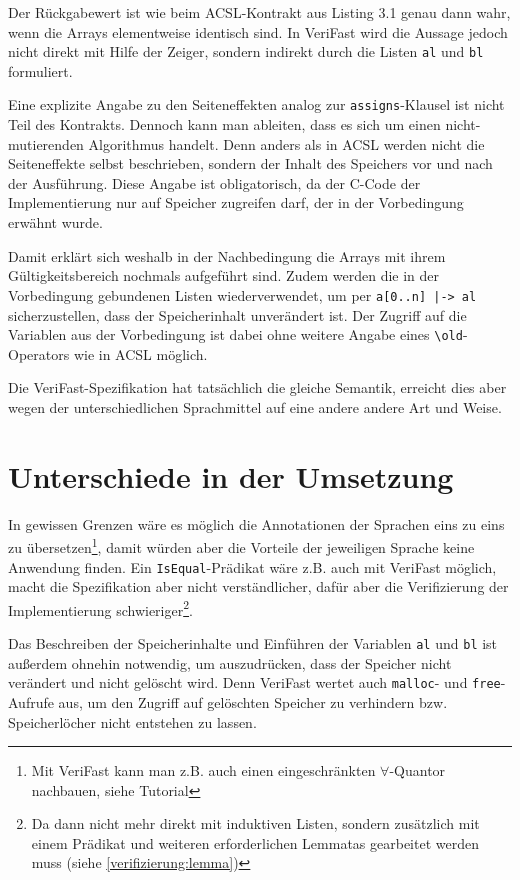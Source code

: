 Der Rückgabewert ist wie beim ACSL-Kontrakt aus Listing 3.1 genau dann wahr, wenn die Arrays elementweise
identisch sind. In VeriFast wird die Aussage jedoch nicht direkt mit Hilfe der Zeiger, sondern indirekt durch die
Listen \lstinline{al} und \lstinline{bl} formuliert.

Eine explizite Angabe zu den Seiteneffekten analog zur \lstinline{assigns}-Klausel ist nicht Teil des Kontrakts. 
Dennoch kann man ableiten, dass es sich um einen nicht-mutierenden Algorithmus handelt. Denn anders als in ACSL
werden nicht die Seiteneffekte selbst beschrieben, sondern der Inhalt des Speichers vor und nach der Ausführung.
Diese Angabe ist obligatorisch, da der C-Code der Implementierung nur auf Speicher zugreifen darf, der in der
Vorbedingung erwähnt wurde.

Damit erklärt sich weshalb in der Nachbedingung die Arrays mit ihrem Gültigkeitsbereich nochmals aufgeführt sind.
Zudem werden die in der Vorbedingung gebundenen Listen wiederverwendet, um per \lstinline{a[0..n] |-> al}
sicherzustellen, dass der Speicherinhalt unverändert ist. Der Zugriff auf die Variablen aus der Vorbedingung ist
dabei ohne weitere Angabe eines \lstinline{\old}-Operators wie in ACSL möglich.

Die VeriFast-Spezifikation hat tatsächlich die gleiche Semantik, erreicht dies aber wegen der 
unterschiedlichen Sprachmittel auf eine andere andere Art und Weise.


\section{Unterschiede in der Umsetzung}

In gewissen Grenzen wäre es möglich die Annotationen der Sprachen eins zu eins zu übersetzen\footnote{Mit
VeriFast kann man z.B. auch einen eingeschränkten \(\forall\)-Quantor nachbauen, siehe Tutorial\cite[Kap. 17]{jacobs-tutorial}},
damit würden aber die Vorteile der jeweiligen Sprache keine Anwendung finden. Ein \lstinline{IsEqual}-Prädikat wäre z.B.
auch mit VeriFast möglich, macht die Spezifikation aber nicht verständlicher, dafür aber die Verifizierung
der Implementierung schwieriger\footnote{Da dann nicht mehr direkt mit induktiven Listen, sondern zusätzlich
mit einem Prädikat und weiteren erforderlichen Lemmatas gearbeitet werden muss (siehe \ref{verifizierung:lemma})}.

Das Beschreiben der Speicherinhalte und Einführen der Variablen  \lstinline{al} und \lstinline{bl} ist außerdem
ohnehin notwendig, um auszudrücken, dass der Speicher nicht verändert und nicht gelöscht wird. Denn VeriFast wertet
auch \lstinline{malloc}- und \lstinline{free}-Aufrufe aus, um den Zugriff auf gelöschten Speicher zu verhindern bzw.
Speicherlöcher nicht entstehen zu lassen.


